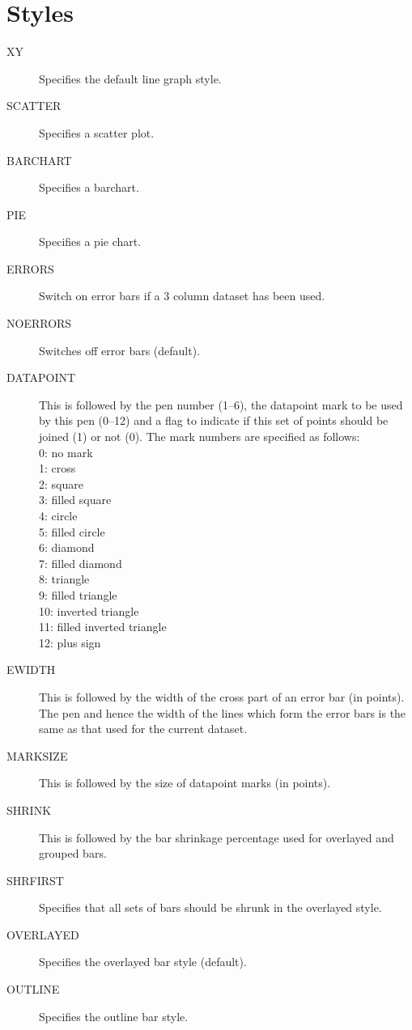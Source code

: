 \documentclass{report}
\begin{document}
\section{Styles}
\label{sec:styles}
\begin{description}
\item[XY] Specifies the default line graph style.
\item[SCATTER] Specifies a scatter plot.
\item[BARCHART] Specifies a barchart.
\item[PIE] Specifies a pie chart.
\item[ERRORS] Switch on error bars if a 3 column dataset has been used.
\item[NOERRORS] Switches off error bars (default).
\item[DATAPOINT] This is followed by the pen number (1--6), the datapoint mark
to be used by this pen (0--12) and a flag to indicate if this set of points should 
be joined (1) or not (0). The mark numbers are specified as follows:\\
0: no mark\\
1: cross\\
2: square\\
3: filled square\\
4: circle\\
5: filled circle\\
6: diamond\\
7: filled diamond\\
8: triangle\\
9: filled triangle\\
10: inverted triangle\\
11: filled inverted triangle\\
12: plus sign
\item[EWIDTH] This is followed by the width of the cross part of an error bar (in 
points). The pen and hence the width of the lines which form the error bars is the 
same as that used for the current dataset.
\item[MARKSIZE] This is followed by the size of datapoint marks (in points).
\item[SHRINK] This is followed by the bar shrinkage percentage used for overlayed 
and grouped bars.
\item[SHRFIRST] Specifies that all sets of bars should be shrunk in the overlayed 
style.
\item[OVERLAYED] Specifies the overlayed bar style (default).
\item[OUTLINE] Specifies the outline bar style.

\end{description}
\end{document}
